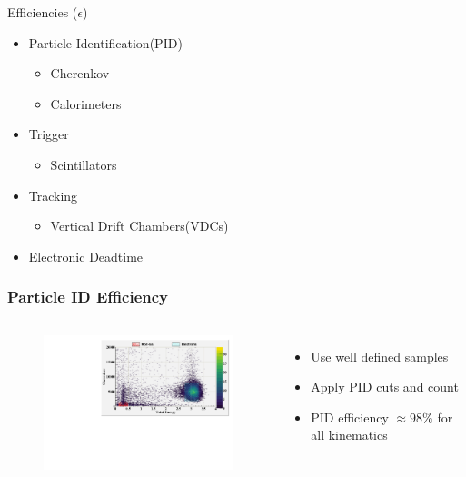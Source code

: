 \documentclass[12pt]{beamer}
\begin{document}
\begin{frame}
\begin{block}{Efficiencies ($\epsilon$)}
		\begin{itemize}
		\item Particle Identification(PID) 
		\begin{itemize}
			\item Cherenkov
			\item Calorimeters
		\end{itemize}
		\item Trigger
		\begin{itemize}
			\item Scintillators
		\end{itemize}
		\item Tracking
		\begin{itemize}
			\item Vertical Drift Chambers(VDCs)
		\end{itemize}
		\item Electronic Deadtime
	\end{itemize}	
\end{block}
\end{frame}

\begin{frame}{}
\frametitle{Particle ID Efficiency}
\begin{columns}
	\begin{figure}[t]%
		\includegraphics[width=8cm]{../images/Thesis/PID_2d}
	\end{figure}
	\begin{itemize}
		\item Use well defined samples
		\item Apply PID cuts and count
		\item PID efficiency $\approx 98\%$  for all kinematics 
	\end{itemize}

\end{columns}	
\end{frame}
\end{document}
